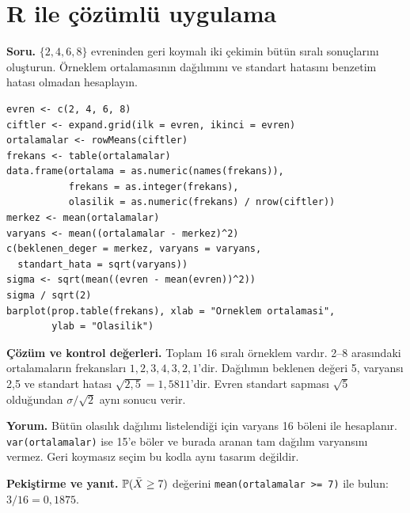 \section{R ile çözümlü uygulama}
\label{sec:r-b04}

\textbf{Soru.} $\{2,4,6,8\}$ evreninden geri koymalı iki çekimin bütün
sıralı sonuçlarını oluşturun. Örneklem ortalamasının dağılımını ve standart
hatasını benzetim hatası olmadan hesaplayın.

\begin{lstlisting}[style=prismR]
evren <- c(2, 4, 6, 8)
ciftler <- expand.grid(ilk = evren, ikinci = evren)
ortalamalar <- rowMeans(ciftler)
frekans <- table(ortalamalar)
data.frame(ortalama = as.numeric(names(frekans)),
           frekans = as.integer(frekans),
           olasilik = as.numeric(frekans) / nrow(ciftler))
merkez <- mean(ortalamalar)
varyans <- mean((ortalamalar - merkez)^2)
c(beklenen_deger = merkez, varyans = varyans,
  standart_hata = sqrt(varyans))
sigma <- sqrt(mean((evren - mean(evren))^2))
sigma / sqrt(2)
barplot(prop.table(frekans), xlab = "Orneklem ortalamasi",
        ylab = "Olasilik")
\end{lstlisting}

\begin{outputguidebox}
\textbf{Çözüm ve kontrol değerleri.} Toplam 16 sıralı örneklem vardır.
2--8 arasındaki ortalamaların frekansları $1,2,3,4,3,2,1$'dir.
Dağılımın beklenen değeri 5, varyansı 2,5 ve standart hatası
$\sqrt{2{,}5}=1{,}5811$'dir. Evren standart sapması $\sqrt{5}$ olduğundan
$\sigma/\sqrt{2}$ aynı sonucu verir.
\end{outputguidebox}

\textbf{Yorum.} Bütün olasılık dağılımı listelendiği için varyans 16 böleni
ile hesaplanır. \texttt{var(ortalamalar)} ise 15'e böler ve burada aranan
tam dağılım varyansını vermez. Geri koymasız seçim bu kodla aynı tasarım değildir.

\textbf{Pekiştirme ve yanıt.} $\P(\bar X\geq7)$ değerini
\texttt{mean(ortalamalar >= 7)} ile bulun: $3/16=0{,}1875$.